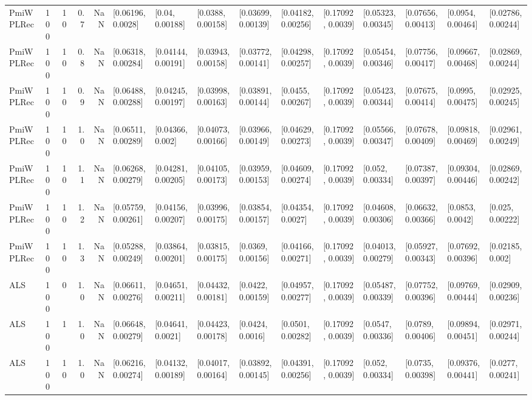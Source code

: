 \begin{tabular}{lllrrllllllllll}
 PmiWPLRec &  100 &    10 &   0.7 &   NaN &   [0.06196, 0.0028] &     [0.04, 0.00188] &   [0.0388, 0.00158] &  [0.03699, 0.00139] &  [0.04182, 0.00256] &  [0.17092, 0.0039] &  [0.05323, 0.00345] &  [0.07656, 0.00413] &   [0.0954, 0.00464] &  [0.02786, 0.00244] \\
 PmiWPLRec &  100 &    10 &   0.8 &   NaN &  [0.06318, 0.00284] &  [0.04144, 0.00191] &  [0.03943, 0.00158] &  [0.03772, 0.00141] &  [0.04298, 0.00257] &  [0.17092, 0.0039] &  [0.05454, 0.00346] &  [0.07756, 0.00417] &  [0.09667, 0.00468] &  [0.02869, 0.00244] \\
 PmiWPLRec &  100 &    10 &   0.9 &   NaN &  [0.06488, 0.00288] &  [0.04245, 0.00197] &  [0.03998, 0.00163] &  [0.03891, 0.00144] &   [0.0455, 0.00267] &  [0.17092, 0.0039] &  [0.05423, 0.00344] &  [0.07675, 0.00414] &   [0.0995, 0.00475] &  [0.02925, 0.00245] \\
 PmiWPLRec &  100 &    10 &   1.0 &   NaN &  [0.06511, 0.00289] &    [0.04366, 0.002] &  [0.04073, 0.00166] &  [0.03966, 0.00149] &  [0.04629, 0.00273] &  [0.17092, 0.0039] &  [0.05566, 0.00347] &  [0.07678, 0.00409] &  [0.09818, 0.00469] &  [0.02961, 0.00249] \\
 PmiWPLRec &  100 &    10 &   1.1 &   NaN &  [0.06268, 0.00279] &  [0.04281, 0.00205] &  [0.04105, 0.00173] &  [0.03959, 0.00153] &  [0.04609, 0.00274] &  [0.17092, 0.0039] &    [0.052, 0.00334] &  [0.07387, 0.00397] &  [0.09304, 0.00446] &  [0.02869, 0.00242] \\
 PmiWPLRec &  100 &    10 &   1.2 &   NaN &  [0.05759, 0.00261] &  [0.04156, 0.00207] &  [0.03996, 0.00175] &  [0.03854, 0.00157] &   [0.04354, 0.0027] &  [0.17092, 0.0039] &  [0.04608, 0.00306] &  [0.06632, 0.00366] &    [0.0853, 0.0042] &    [0.025, 0.00222] \\
 PmiWPLRec &  100 &    10 &   1.3 &   NaN &  [0.05288, 0.00249] &  [0.03864, 0.00201] &  [0.03815, 0.00175] &   [0.0369, 0.00156] &  [0.04166, 0.00271] &  [0.17092, 0.0039] &  [0.04013, 0.00279] &  [0.05927, 0.00343] &  [0.07692, 0.00396] &    [0.02185, 0.002] \\
       ALS &  100 &     0 &   1.0 &   NaN &  [0.06611, 0.00276] &  [0.04651, 0.00211] &  [0.04432, 0.00181] &   [0.0422, 0.00159] &  [0.04957, 0.00277] &  [0.17092, 0.0039] &  [0.05487, 0.00339] &  [0.07752, 0.00396] &  [0.09769, 0.00444] &  [0.02909, 0.00236] \\
       ALS &  100 &     1 &   1.0 &   NaN &  [0.06648, 0.00279] &   [0.04641, 0.0021] &  [0.04423, 0.00178] &    [0.0424, 0.0016] &   [0.0501, 0.00282] &  [0.17092, 0.0039] &   [0.0547, 0.00336] &   [0.0789, 0.00406] &  [0.09894, 0.00451] &  [0.02971, 0.00244] \\
       ALS &  100 &    10 &   1.0 &   NaN &  [0.06216, 0.00274] &  [0.04132, 0.00189] &  [0.04017, 0.00164] &  [0.03892, 0.00145] &  [0.04391, 0.00256] &  [0.17092, 0.0039] &    [0.052, 0.00334] &   [0.0735, 0.00398] &  [0.09376, 0.00441] &   [0.0277, 0.00241] \\
\bottomrule
\end{tabular}
